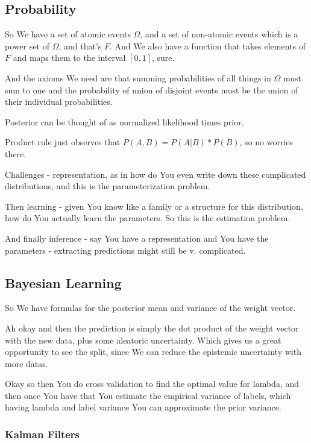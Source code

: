 \documentclass{article}
\begin{document}
	\subsection{Probability}
	
		So We have a set of atomic events $\Omega$, and a set of non-atomic events which is a power set of $\Omega$, and that's $F$. And We also have a function that takes elements of $F$ and maps them to the interval $[0, 1]$, sure.
		
		And the axioms We need are that summing probabilities of all things in $\Omega$ must sum to one and the probability of union of disjoint events must be the union of their individual probabilities. 
		
		Posterior can be thought of as normalized likelihood times prior.
		
		Product rule just observes that $P(A, B) = P(A|B)*P(B)$, so no worries there.
		
		Challenges - representation, as in how do You even write down these complicated distributions, and this is the parameterization problem.
		
		Then learning - given You know like a family or a structure for this distribution, how do You actually learn the parameters. So this is the estimation problem.
		
		And finally inference - say You have a representation and You have the parameters - extracting predictions might still be v. complicated.
		
	\subsection{Bayesian Learning}
	
		So We have formulas for the posterior mean and variance of the weight vector.
		
		Ah okay and then the prediction is simply the dot product of the weight vector with the new data, plus some aleatoric uncertainty. Which gives us a great opportunity to see the split, since We can reduce the epistemic uncertainty with more datas.
		
		Okay so then You do cross validation to find the optimal value for lambda, and then once You have that You estimate the empirical variance of labels, which having lambda and label variance You can approximate the prior variance.
		
		\subsubsection{Kalman Filters}
		
\end{document}
